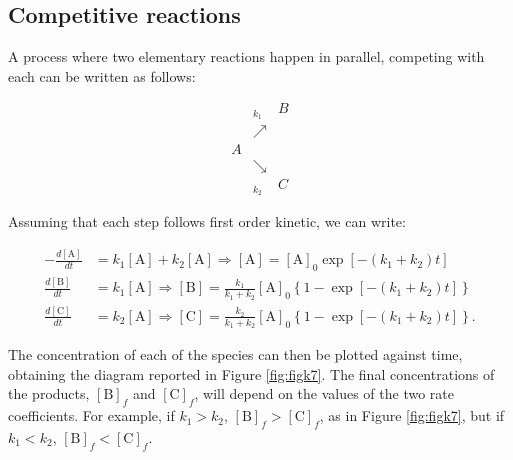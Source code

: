 \documentclass[
  9pt,
]{extbook}
\theoremstyle{definition}
\theoremstyle{definition}
\theoremstyle{definition}
\theoremstyle{definition}
\theoremstyle{remark}
\begin{document}
\subsection{Competitive reactions}\label{competitive-reactions}

A process where two elementary reactions happen in parallel, competing with each can be written as follows:

\begin{equation}
\begin{matrix}
 &_{k_1}  & B\\
 &\nearrow & \\
A &   & \\
 &\searrow& \\
  &_{k_2}  & C
\end{matrix}
\end{equation}

Assuming that each step follows first order kinetic, we can write:

\begin{equation}
\begin{aligned}
-\frac{d[\mathrm{A}]}{dt} &=k_1 [\mathrm{A}]+k_2 [\mathrm{A}] \Rightarrow [\mathrm{A}]=[\mathrm{A}]_0\exp \left[ -(k_1+k_2)t \right] \\
\frac{d[\mathrm{B}]}{dt} &=k_1 [\mathrm{A}] \Rightarrow [\mathrm{B}]=\frac{k_1}{k_1+k_2}[\mathrm{A}]_0 \left\{ 1-\exp \left[ -(k_1+k_2)t \right] \right\} \\
\frac{d[\mathrm{C}]}{dt} &=k_2 [\mathrm{A}]\Rightarrow [\mathrm{C}]=\frac{k_2}{k_1+k_2}[\mathrm{A}]_0 \left\{ 1-\exp \left[ -(k_1+k_2)t \right] \right\}.
\end{aligned}
\label{eq:kincomp4b}
\end{equation}

The concentration of each of the species can then be plotted against time, obtaining the diagram reported in Figure \ref{fig:figk7}. The final concentrations of the products, \([\mathrm{B}]_f\) and \([\mathrm{C}]_f\), will depend on the values of the two rate coefficients. For example, if \(k_1>k_2\), \([\mathrm{B}]_f>[\mathrm{C}]_f\), as in Figure \ref{fig:figk7}, but if \(k_1<k_2\), \([\mathrm{B}]_f<[\mathrm{C}]_f\).
\end{document}
